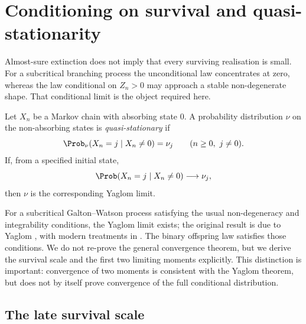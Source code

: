 \section{Conditioning on survival and quasi-stationarity}
\label{sec:qsd}

Almost-sure extinction does not imply that every surviving realisation is small.
For a subcritical branching process the unconditional law concentrates at zero,
whereas the law conditional on \(Z_n>0\) may approach a stable non-degenerate shape.
That conditional limit is the object required here.

\begin{definition}
Let \(X_n\) be a Markov chain with absorbing state \(0\).  A probability distribution
\(\nu\) on the non-absorbing states is \emph{quasi-stationary} if
\begin{equation}
  \Prob_\nu(X_n=j\mid X_n\neq0)=\nu_j
  \qquad(n\geq0,\ j\neq0).
  \label{eq:qsd-definition}
\end{equation}
If, from a specified initial state,
\begin{equation}
  \Prob(X_n=j\mid X_n\neq0)\longrightarrow\nu_j,
  \label{eq:yaglom-definition}
\end{equation}
then \(\nu\) is the corresponding Yaglom limit.
\end{definition}

For a subcritical Galton--Watson process satisfying the usual non-degeneracy and
integrability conditions, the Yaglom limit exists; the original result is due to
Yaglom \cite{Yaglom1947}, with modern treatments in
\cite{Harris1963,AthreyaNey1972}.  The binary offspring law satisfies those
conditions.  We do not re-prove the general convergence theorem, but we derive the
survival scale and the first two limiting moments explicitly.  This distinction is
important: convergence of two moments is consistent with the Yaglom theorem, but
does not by itself prove convergence of the full conditional distribution.

\subsection{The late survival scale}
\label{sec:late-survival}

